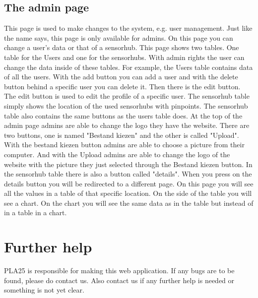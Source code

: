 \documentclass[a4paper]{article}
\begin{document}
\newpage
\subsection{The admin page}
This page is used to make changes to the system, e.g. user management. Just like the name says, this page is only available for admins. On this page you can change a user's data or that of a sensorhub.
\newline
\newline
This page shows two tables. One table for the Users and one for the sensorhubs. With admin rights the user can change the data inside of these tables.
\newline
\newline
For example, the Users table contains data of all the users. With the add button you can add a user and with the delete button behind a specific user you can delete it. Then there is the edit button. The edit button is used to edit the profile of a specific user.
\newline
\newline
The sensorhub table simply shows the location of the used sensorhubs with pinpoints. The sensorhub table also contains the same buttons as the users table does.
\newline
\newline
At the top of the admin page admins are able to change the logo they have the website. There are two buttons, one is named "Bestand kiezen" and the other is called "Upload".  With the bestand kiezen button admins are able to choose a picture from their computer. And with the Upload admins are able to change the logo of the website with the picture they just selected through the Bestand kiezen button.
\newline
\newline
In the sensorhub table there is also a button called "details". When you press on the details button you will be redirected to a different page. On this page you will see all the values in a table of that specific location. On the side of the table you will see a chart. On the chart you will see the same data as in the table but instead of in a table in a chart.

\newpage
\section{Further help}
PLA25 is responsible for making this web application. If any bugs are to be found, please do contact us.
Also contact us if any further help is needed or something is not yet clear.
\end{document}
